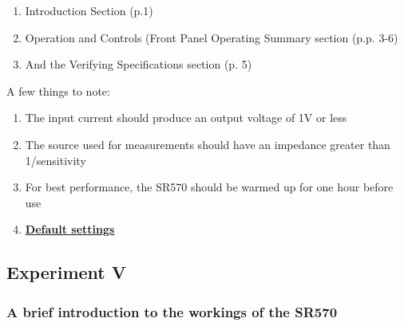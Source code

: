 \documentclass{../lab}
\begin{document}
\begin{enumerate}
    \item Introduction Section (p.1)

    \item Operation and Controls (Front Panel Operating Summary section (p.p. 3-6)

    \item And the Verifying Specifications section (p. 5)

\end{enumerate}

\noindent A few things to note:

\begin{enumerate}
    \item The input current should produce an output voltage of 1V or less

    \item The source used for measurements should have an impedance greater than 1/sensitivity

    \item For best performance, the SR570 should be warmed up for one hour before use

    \item \href{http://experimentationlab.berkeley.edu/defaultsettings}{\textbf{Default settings}}

\end{enumerate}

\subsection{Experiment V}

\subsubsection{A brief introduction to the workings of the SR570}
\end{document}
